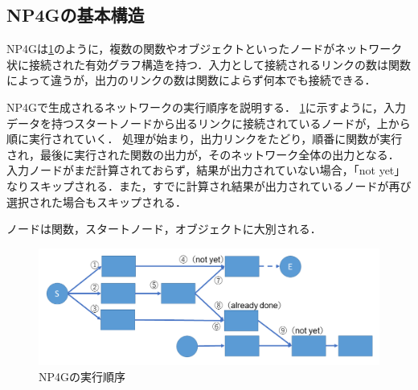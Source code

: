 \documentclass[exploratorypaper]{jsaiart} %
\begin{document}
\subsection{NP4Gの基本構造}
NP4Gは\ref{fig:sequence}のように，複数の関数やオブジェクトといったノードがネットワーク状に接続された有効グラフ構造を持つ．入力として接続されるリンクの数は関数によって違うが，出力のリンクの数は関数によらず何本でも接続できる．

NP4Gで生成されるネットワークの実行順序を説明する．
\ref{fig:sequence}に示すように，入力データを持つスタートノードから出るリンクに接続されているノードが，上から順に実行されていく．
処理が始まり，出力リンクをたどり，順番に関数が実行され，最後に実行された関数の出力が，そのネットワーク全体の出力となる．
入力ノードがまだ計算されておらず，結果が出力されていない場合，「not yet」なりスキップされる．また，すでに計算され結果が出力されているノードが再び選択された場合もスキップされる．

ノードは関数，スタートノード，オブジェクトに大別される．

\begin{figure}[t]
    \begin{center}
        \includegraphics[width=130mm]{sequence.png}
    \end{center}
    \capwidth=90mm %
    \caption{NP4Gの実行順序}
    \label{fig:sequence}
\end{figure}
\end{document}
